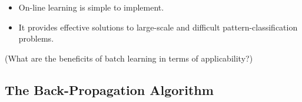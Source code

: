 \documentclass[twocolumn]{article}
\begin{document}
		 \begin{itemize}
			 \item On-line learning is simple to implement.
			 \item It provides effective solutions to large-scale and difficult pattern-classification problems.
		 \end{itemize}

		 (What are the beneficits of batch learning in terms of applicability?)

 \subsection{The Back-Propagation Algorithm}
\end{document}
